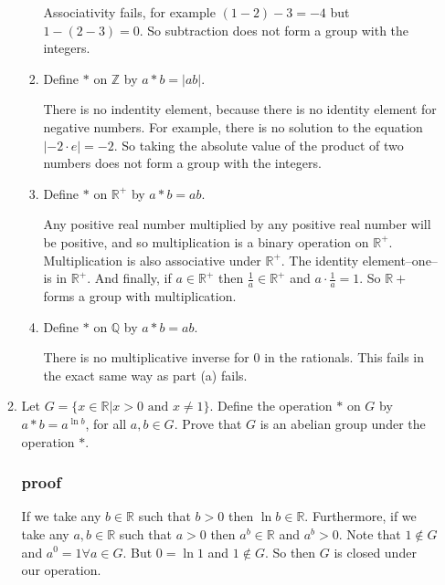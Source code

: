 \documentclass[letterpaper]{article}
\begin{document}
\begin{enumerate}
\begin{enumerate}
\begin{enumerate}
      Associativity fails, for example $(1-2)-3=-4$ but $1-(2-3)=0$. So subtraction does not form a group with the integers.
    \item
      Define $*$ on $\mathbb{Z}$ by $a*b=|ab|$.

      There is no indentity element, because there is no identity element for negative numbers. For example, there is no solution to the equation $|-2\cdot e|=-2$. So taking the absolute value of the product of two numbers does not form a group with the integers.
    \item
      Define $*$ on $\mathbb{R}^+$ by $a*b=ab$.

      Any positive real number multiplied by any positive real number will be positive, and so multiplication is a binary operation on $\mathbb{R}^+$. Multiplication is also associative under $\mathbb{R}^+$. The identity element--one--is in $\mathbb{R}^+$. And finally, if $a\in \mathbb{R}^+$ then $\frac{1}{a}\in \mathbb{R}^+$ and $a\cdot\frac{1}{a}=1$. So $\mathbb{R}+$ forms a group with multiplication.
    \item
      Define $*$ on $\mathbb{Q}$ by $a*b=ab$.

      There is no multiplicative inverse for 0 in the rationals. This fails in the exact same way as part (a) fails.
    \end{enumerate}
  \setcounter{enumii}{8}
  \item
    Let $G=\{x\in \mathbb{R}|x>0\text{ and }x\ne 1\}$. Define the operation $*$ on $G$ by $a*b=a^{\ln b}$, for all $a,b\in G$. Prove that $G$ is an abelian group under the operation $*$.

    \subsubsection*{proof}
    If we take any $b\in\mathbb{R}$ such that $b>0$ then $\ln b\in  \mathbb{R}$.
    Furthermore, if we take any $a,b\in \mathbb{R}$ such that $a>0$ then $a^b\in \mathbb{R}$ and $a^b>0$.
    Note that $1\not\in G$ and $a^0=1\forall a\in G$. But $0=\ln 1$ and $1\not\in G$.
    So then $G$ is closed under our operation.


\end{enumerate}
\end{enumerate}
\end{document}
